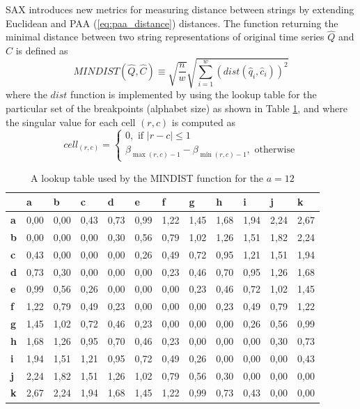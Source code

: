 SAX introduces new metrics for measuring distance between strings by extending Euclidean and PAA (\ref{eq:paa_distance}) distances. 
The function returning the minimal distance between two string representations of original time series $\widehat{Q}$ and $\widehat{C}$ is defined as
\begin{equation}
MINDIST(\widehat{Q},\widehat{C}) \equiv \sqrt{ \frac{n}{w} } \sqrt{ \sum_{i=1}^{w} ( dist( \widehat{q}_{i}, \widehat{c}_{i} ) )^{2}}
\label{eq:sax_mindist}
\end{equation} 
where the $dist$ function is implemented by using the lookup table for the particular set of the breakpoints (alphabet size) as shown in 
Table \ref{tbl:sax_lookup}, and where the singular value for each cell $(r,c)$ is computed as 
\begin{equation}
cell_{(r,c)} = 
\begin{cases} 
0, \text{ if }\left| r-c \right| \leq 1 \\
\beta_{\max(r,c) - 1} - \beta_{\min(r,c) - 1}, \text{ otherwise}
\end{cases}
\label{eq:cell}
\end{equation}


\begin{table}
\caption{A lookup table used by the MINDIST function for the $a=12$}
\label{tbl:sax_lookup}
\small
\begin{tabularx}{\textwidth}{|l|X|X|X|X|X|X|X|X|X|X|X|}
\hline
&\textbf{a}&\textbf{b}&\textbf{c}&\textbf{d}&\textbf{e}&\textbf{f}&\textbf{g}&\textbf{h}&\textbf{i}&\textbf{j}&\textbf{k} \\
\hline
\textbf{a}& 0,00 & 0,00 & 0,43 & 0,73 & 0,99 & 1,22 & 1,45 & 1,68 & 1,94 & 2,24 & 2,67 \\
\hline
\textbf{b}& 0,00 & 0,00 & 0,00 & 0,30 & 0,56 & 0,79 & 1,02 & 1,26 & 1,51 & 1,82 & 2,24 \\
\hline
\textbf{c}& 0,43 & 0,00 & 0,00 & 0,00 & 0,26 & 0,49 & 0,72 & 0,95 & 1,21 & 1,51 & 1,94 \\ 
\hline
\textbf{d}& 0,73 & 0,30 & 0,00 & 0,00 & 0,00 & 0,23 & 0,46 & 0,70 & 0,95 & 1,26 & 1,68 \\ 
\hline
\textbf{e}& 0,99 & 0,56 & 0,26 & 0,00 & 0,00 & 0,00 & 0,23 & 0,46 & 0,72 & 1,02 & 1,45 \\ 
\hline
\textbf{f}& 1,22 & 0,79 & 0,49 & 0,23 & 0,00 & 0,00 & 0,00 & 0,23 & 0,49 & 0,79 & 1,22 \\ 
\hline
\textbf{g}& 1,45 & 1,02 & 0,72 & 0,46 & 0,23 & 0,00 & 0,00 & 0,00 & 0,26 & 0,56 & 0,99 \\ 
\hline
\textbf{h}& 1,68 & 1,26 & 0,95 & 0,70 & 0,46 & 0,23 & 0,00 & 0,00 & 0,00 & 0,30 & 0,73 \\ 
\hline
\textbf{i}& 1,94 & 1,51 & 1,21 & 0,95 & 0,72 & 0,49 & 0,26 & 0,00 & 0,00 & 0,00 & 0,43 \\ 
\hline
\textbf{j}& 2,24 & 1,82 & 1,51 & 1,26 & 1,02 & 0,79 & 0,56 & 0,30 & 0,00 & 0,00 & 0,00 \\ 
\hline
\textbf{k}& 2,67 & 2,24 & 1,94 & 1,68 & 1,45 & 1,22 & 0,99 & 0,73 & 0,43 & 0,00 & 0,00 \\ 
\hline
\end{tabularx}
\end{table}

